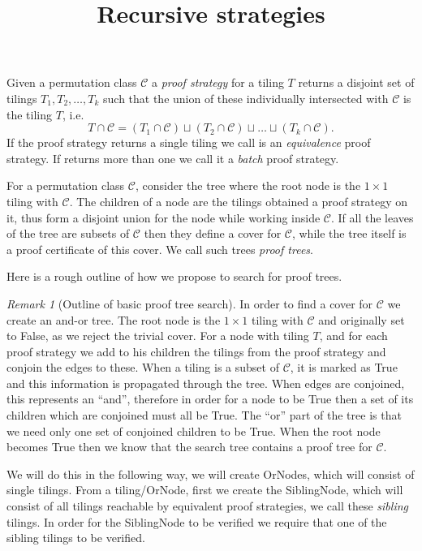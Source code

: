 \documentclass{amsart}
\title{Recursive strategies}
\theoremstyle{definition}
\theoremstyle{remark}
\newtheorem{rmk}{Remark}
\newcommand{\mcC}{\mathcal{C}}
\begin{document}
\maketitle

Given a permutation class $\mcC$ a \emph{proof strategy} for a tiling $T$
returns a disjoint set of tilings $T_1, T_2, \ldots, T_k$ such that the union of
these individually intersected with $\mcC$ is the tiling $T$, i.e.
\[
  T \cap \mcC = ( T_1 \cap \mcC ) \sqcup ( T_2 \cap \mcC ) \sqcup \ldots \sqcup (T_k \cap \mcC).
\]
If the proof strategy returns a single tiling we call is an \emph{equivalence}
proof strategy. If returns more than one we call it a \emph{batch} proof
strategy.

For a permutation class $\mcC$, consider the tree where the root node is the $1
\times 1$ tiling with $\mcC$. The children of a node are the tilings obtained a
proof strategy on it, thus form a disjoint union for the node while working
inside $\mcC$. If all the leaves of the tree are subsets of $\mcC$ then they
define a cover for $\mcC$, while the tree itself is a proof certificate of this
cover. We call such trees \emph{proof trees}.

Here is a rough outline of how we propose to search for proof trees.

\begin{rmk}[Outline of basic proof tree search]
  In order to find a cover for $\mcC$ we create an and-or tree. The root node is
  the $1 \times 1$ tiling with $\mcC$ and originally set to \textsf{False}, as
  we reject the trivial cover. For a node with tiling $T$, and for each proof
  strategy we add to his children the tilings from the proof strategy and
  conjoin the edges to these. When a tiling is a subset of $\mcC$, it is marked
  as \textsf{True} and this information is propagated through the tree. When
  edges are conjoined, this represents an ``and'', therefore in order for a node
  to be \textsf{True} then a set of its children which are conjoined must all be
  \textsf{True}. The ``or'' part of the tree is that we need only one set of
  conjoined children to be \textsf{True}. When the root node becomes
  \textsf{True} then we know that the search tree contains a proof tree for
  $\mcC$.
\end{rmk}

We will do this in the following way, we will create OrNodes, which will consist
of single tilings. From a tiling/OrNode, first we create the SiblingNode, which
will consist of all tilings reachable by equivalent proof strategies, we call
these \emph{sibling} tilings. In order for the SiblingNode to be verified we
require that one of the sibling tilings to be verified.
\end{document}
